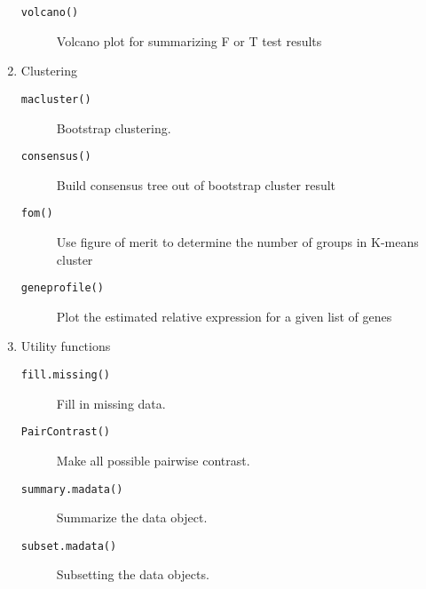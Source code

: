 \begin{enumerate}
\begin{description}
\item[{\tt volcano()}] Volcano plot for summarizing F or T test results
\end{description}
\item Clustering
\begin{description}
\item[{\tt macluster()}] Bootstrap clustering.
\item[{\tt consensus()}] Build consensus tree out of bootstrap cluster result
\item[{\tt fom()}] Use figure of merit to determine the number of groups in K-means cluster
\item[{\tt geneprofile()}] Plot the estimated relative expression for a given list of genes
\end{description}
\item Utility functions
\begin{description}
\item[{\tt fill.missing()}] Fill in missing data.
\item[{\tt PairContrast()}] Make all possible pairwise contrast.
\item[{\tt summary.madata()}] Summarize the data object.
\item[{\tt subset.madata()}] Subsetting the data objects.
\end{description}
\end{enumerate}

